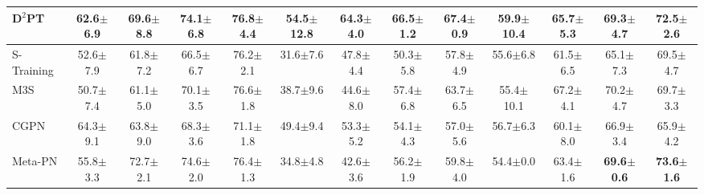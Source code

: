 \begin{table*}[]
{\begin{tabular}{l|cccc|cccc|cccc}
D$^2$PT     & 62.6{\small$\pm$6.9}                    & 69.6{\small$\pm$8.8}                    & 74.1{\small$\pm$6.8}                    & 76.8{\small$\pm$4.4}                     & 54.5{\small$\pm$12.8}                    & 64.3{\small$\pm$4.0}                    & 66.5{\small$\pm$1.2}                    & 67.4{\small$\pm$0.9}                     & 59.9{\small$\pm$10.4}                    & 65.7{\small$\pm$5.3}                    & 69.3{\small$\pm$4.7}                     & 72.5{\small$\pm$2.6}                    \\
\hline
S-Training     & 52.6{\small$\pm$7.9} & 61.8{\small$\pm$7.2} & 66.5{\small$\pm$6.7}  & 76.2{\small$\pm$2.1}  & 31.6{\small$\pm$7.6}  & 47.8{\small$\pm$4.4}  & 50.3{\small$\pm$5.8} & 57.8{\small$\pm$4.9}  & 55.6{\small$\pm$6.8} & 61.5{\small$\pm$6.5}  & 65.1{\small$\pm$7.3}  & 69.5{\small$\pm$4.7} \\
M3S     & 50.7{\small$\pm$7.4}  & 61.1{\small$\pm$5.0} & 70.1{\small$\pm$3.5}  & 76.6{\small$\pm$1.8}  & 38.7{\small$\pm$9.6} & 44.6{\small$\pm$8.0}   & 57.4{\small$\pm$6.8}   & 63.7{\small$\pm$6.5}  & 55.4{\small$\pm$10.1}  & 67.2{\small$\pm$4.1} & 70.2{\small$\pm$4.7} & 69.7{\small$\pm$3.3}\\
CGPN & 64.3{\small$\pm$9.1} & 63.8{\small$\pm$9.0} & 68.3{\small$\pm$3.6} & 71.1{\small$\pm$1.8} & 49.4{\small$\pm$9.4} & 53.3{\small$\pm$5.2} & 54.1{\small$\pm$4.3} & 57.0{\small$\pm$5.6} & 56.7{\small$\pm$6.3} & 60.1{\small$\pm$8.0} & 66.9{\small$\pm$3.4} & 65.9{\small$\pm$4.2} \\
Meta-PN    & 55.8{\small$\pm$3.3}  & 72.7{\small$\pm$2.1} & 74.6{\small$\pm$2.0} & 76.4{\small$\pm$1.3} & 34.8{\small$\pm$4.8} & 42.6{\small$\pm$3.6} & 56.2{\small$\pm$1.9} & 59.8{\small$\pm$4.0} & 54.4{\small$\pm$0.0} & 63.4{\small$\pm$1.6} & \textbf{69.6{\small$\pm$0.6}} & \textbf{73.6{\small$\pm$1.6}} \\

\end{tabular}}
\end{table*}
